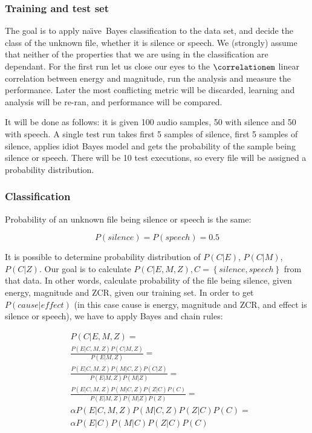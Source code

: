 \documentclass[english,11pt]{article}
\newcommand{\naive}{na\"{\i}ve\ }
\numberwithin{equation}{section}
\begin{document}
\subsubsection{Training and test set}

The goal is to apply \naive Bayes classification to the data set, and decide
the class of the unknown file, whether it is silence or speech. We (strongly)
assume that neither of the properties that we are using in the classification
are dependant. For the first run let us close our eyes to the
$\correlationem$ linear correlation between energy and magnitude, run the
analysis and measure the performance. Later the most conflicting metric will be
discarded, learning and analysis will be re-ran, and performance will be
compared.

It will be done as follows: it is given 100 audio samples, 50 with silence and
50 with speech. A single test run takes first 5 samples of silence, first 5
samples of silence, applies idiot Bayes model\cite{idiotbayes} and gets the
probability of the sample being silence or speech. There will be 10 test
executions, so every file will be assigned a probability distribution.

\subsubsection{Classification}

Probability of an unknown file being silence or speech is the same:

$$ P(silence) = P(speech) = 0.5 $$

It is possible to determine probability distribution of $P(C|E)$, $P(C|M)$,
$P(C|Z)$. Our goal is to calculate $ P(C | E, M, Z), C = \left\{ silence,
speech \right\}$ from that data. In other words, calculate probability of the
file being silence, given energy, magnitude and ZCR, given our training set. In
order to get $P(cause|effect)$ (in this case cause is energy, magnitude and
ZCR, and effect is silence or speech), we have to apply Bayes and chain rules:

\begin{align}
   & P(C | E, M, Z) = \\
   & \frac{ P(E|C,M,Z) P(C|M,Z) }{ P(E|M,Z) } = \\
   & \frac{ P(E|C,M,Z) P(M|C,Z) P(C|Z) }{ P(E|M,Z) P(M|Z) } = \\
   & \frac{ P(E|C,M,Z) P(M|C,Z) P(Z|C) P(C) }{ P(E|M,Z) P(M|Z) P(Z) } =
    \label{eq:chain_rule} \\
   & \alpha P(E|C,M,Z) P(M|C,Z) P(Z|C) P(C) = \label{eq:alpha} \\
   & \alpha P(E|C) P(M|C) P(Z|C) P(C) \label{eq:independence}
\end{align}
\end{document}
